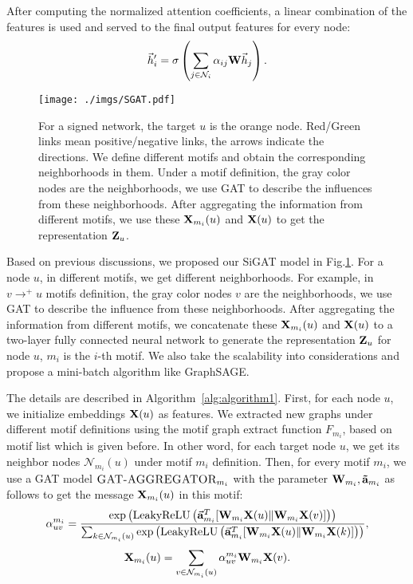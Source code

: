 \documentclass[runningheads]{llncs}
\begin{document}
After computing the normalized attention coefficients, a linear combination of the features is used and served to the final output features for every node:
\begin{equation}\label{eqnatt}
	\vec{h}'_i = \sigma\left(\sum_{j\in\mathcal{N}_i} \alpha_{ij} {\bf W}\vec{h}_j\right).
\end{equation}

\begin{figure*}[!ht]
    \centering
    \texttt{[image: ./imgs/SGAT.pdf]}
    \caption{For a signed network, the target $u$ is the orange node. Red/Green links mean positive/negative links, the arrows indicate the directions.
    We define different motifs and obtain the corresponding neighborhoods in them. Under a motif definition, the gray color nodes are the neighborhoods, we use GAT to describe the influences from these neighborhoods. After aggregating the information from different motifs, we use these $\mathbf{X}_{m_i}(u)$ and $\mathbf{X}(u)$ to get the representation $\mathbf{Z}_u$.  }
    \label{fig:sigat}

\end{figure*}

Based on previous discussions, we proposed our SiGAT model in Fig.\ref{fig:sigat}. For a node $u$, in different motifs, we get different neighborhoods. For example, in $v\rightarrow^{+} u$ motifs definition, the gray color nodes $v$ are the neighborhoods, we use GAT to describe the influence from these neighborhoods. After aggregating the information from different motifs, we concatenate these $\mathbf{X}_{m_i}(u)$ and $\mathbf{X}(u)$ to a two-layer fully connected neural network to generate the representation $\mathbf{Z}_u$ for node $u$, $m_i$ is the $i$-th motif.
We also take the scalability into considerations and propose a mini-batch algorithm like GraphSAGE\cite{hamilton2017inductive}. 

The details are described in Algorithm~\ref{alg:algorithm1}. 
First, for each node $u$, we initialize embeddings $\mathbf{X}(u)$ as features. 
We extracted new graphs under different motif definitions using the motif graph extract function $F_{m_i}$, based on motif list which is given before.  
In other word, for each target node $u$, we get its neighbor nodes $\mathcal{N}_{m_i}(u)$ under motif $m_i$ definition. 
Then, for every motif $m_i$, we use a GAT model $\textsc{GAT-AGGREGATOR}_{m_i}$ with the parameter ${\bf W}_{m_i},{\bf \vec{a}}_{m_i}$ as follows to get the message $\mathbf{X}_{m_i}(u)$ in this motif:
\begin{equation}
    \label{eq:gat1}
    \alpha_{uv}^{m_i} = \frac{\exp\left(\text{LeakyReLU}\left(\vec{\bf a}_{m_i}^T[{\bf W}_{m_i}{\mathbf{X}(u)}\|{\bf W}_{m_i}{\mathbf{X}(v)}]\right)\right)}{\sum_{k\in\mathcal{N}_{m_i}(u)} \exp\left(\text{LeakyReLU}\left(\vec{\bf a}_{m_i}^T[{\bf W}_{m_i}{\mathbf{X}(u)}\|{\bf W}_{m_i}{\mathbf{X}(k)}]\right)\right)},
\end{equation}
\begin{equation}\label{eqnatt}
	\mathbf{X}_{m_i}(u) = \sum_{v\in\mathcal{N}_{m_i}(u)} \alpha_{uv}^{m_i} {\bf W}_{m_i}\mathbf{X}(v).
\end{equation}
\end{document}
